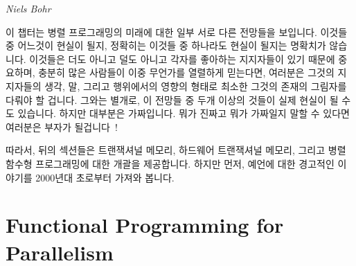 
%
	 {\emph{Niels Bohr}}

이 챕터는 병렬 프로그래밍의 미래에 대한 일부 서로 다른 전망들을 보입니다.
이것들 중 어느것이 현실이 될지, 정확히는 이것들 중 하나라도 현실이 될지는
명확치가 않습니다.
이것들은 더도 아니고 덜도 아니고 각자를 좋아하는 지지자들이 있기 때문에
중요하며, 충분히 많은 사람들이 이중 무언가를 열렬하게 믿는다면, 여러분은 그것의
지지자들의 생각, 말, 그리고 행위에서의 영향의 형태로 최소한 그것의 존재의
그림자를 다뤄야 할 겁니다.
그와는 별개로, 이 전망들 중 두개 이상의 것들이 실제 현실이 될 수도 있습니다.
하지만 대부분은 가짜입니다.
뭐가 진짜고 뭐가 가짜일지 말할 수 있다면 여러분은 부자가
될겁니다~\cite{KeithRSpitz1977}!

따라서, 뒤의 섹션들은 트랜잭셔널 메모리, 하드웨어 트랜잭셔널 메모리, 그리고
병렬 함수형 프로그래밍에 대한 개괄을 제공합니다.
하지만 먼저, 예언에 대한 경고적인 이야기를 2000년대 초로부터 가져와 봅니다.
\iffalse

This chapter presents some conflicting visions of the future of parallel
programming.
It is not clear which of these will come to pass, in fact, it is not
clear that any of them will.
They are nevertheless important because each vision has its devoted
adherents, and if enough people believe in something fervently enough,
you will need to deal with at least the shadow of that thing's existence
in the form of its
influence on the thoughts, words, and deeds of its adherents.
Besides which, it is entirely possible that one or more of these visions
will actually come to pass.
But most are bogus.
Tell which is which and you'll be rich~\cite{KeithRSpitz1977}!

Therefore, the following sections give an overview of transactional
memory, hardware transactional memory,
parallel functional programming, and quantum computing.
But first, a cautionary tale on prognostication taken from the early 2000s.
\fi





\section{Functional Programming for Parallelism}
\label{sec:future:Functional Programming for Parallelism}

